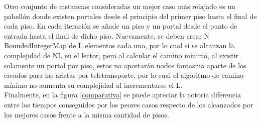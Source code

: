 Otro conjunto de instancias consideradas un mejor caso más relajado es un pabellón donde existen portales desde el principio del primer piso hasta el final de cada piso. En cada iteración se añade un piso y un portal desde el punto de entrada hasta el final de dicho piso. Nuevamente, se deben crear N BoundedIntegerMap de L elementos cada uno, por lo cual sí se alcanzan la complejidad de NL en el lector, pero al calcular el camino mínimo, al existir solamente un portal por piso, estos no aportarán nodos fantasma aparte de los creados para las aristas por teletransporte, por lo cual el algoritmo de camino mínimo no aumenta su complejidad al incrementarse el L.\\

 Finalmente, en la figura \ref{comparativa} se puede apreciar la notoria diferencia entre los tiempos conseguidos por los peores casos respecto de los alcanzados por los mejores casos frente a la misma cantidad de pisos.


\newpage
